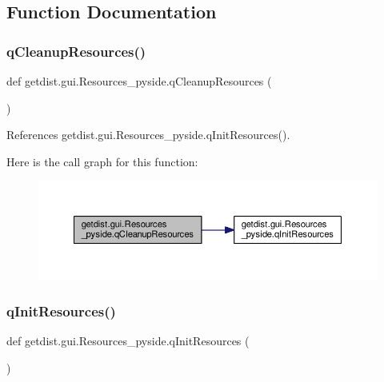 \subsection{Function Documentation}
\mbox{\label{namespacegetdist_1_1gui_1_1Resources__pyside_a92e826086b118b8a15304a28b858a8f4}} 
\subsubsection{\texorpdfstring{q\+Cleanup\+Resources()}{qCleanupResources()}}
{\footnotesize\ttfamily def getdist.\+gui.\+Resources\+\_\+pyside.\+q\+Cleanup\+Resources (\begin{DoxyParamCaption}{ }\end{DoxyParamCaption})}



References getdist.\+gui.\+Resources\+\_\+pyside.\+q\+Init\+Resources().

Here is the call graph for this function\+:
\nopagebreak
\begin{figure}[H]
\begin{center}
\leavevmode
\includegraphics[width=350pt]{namespacegetdist_1_1gui_1_1Resources__pyside_a92e826086b118b8a15304a28b858a8f4_cgraph}
\end{center}
\end{figure}
\mbox{\label{namespacegetdist_1_1gui_1_1Resources__pyside_a0cc0e01d43533b37582a95a0061db0f8}} 
\subsubsection{\texorpdfstring{q\+Init\+Resources()}{qInitResources()}}
{\footnotesize\ttfamily def getdist.\+gui.\+Resources\+\_\+pyside.\+q\+Init\+Resources (\begin{DoxyParamCaption}{ }\end{DoxyParamCaption})}



